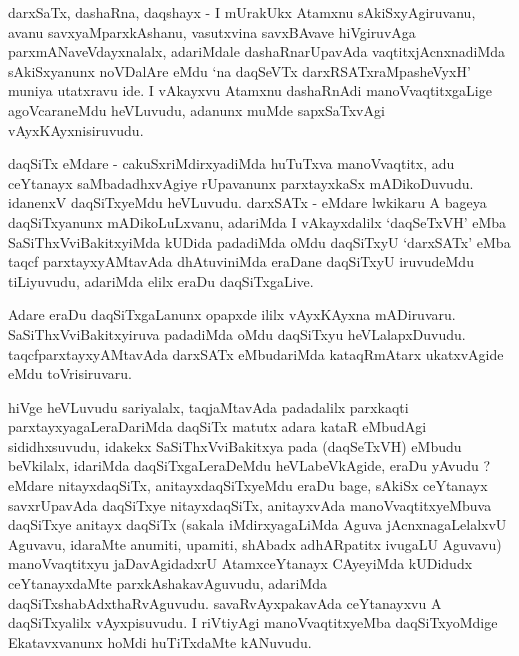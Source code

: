 \begin{artha}
darxSaTx, dashaRna, daqshayx - I mUrakUkx Atamxnu sAkiSxyAgiruvanu, avanu savxyaMparxkAshanu, vasutxvina savxBAvave hiVgiruvAga parxmANaveVdayxnalalx, adariMdale dashaRnarUpavAda vaqtitxjAcnxnadiMda sAkiSxyanunx noVDalAre eMdu `na daqSeVTx darxRSATxraMpasheVyxH' muniya utatxravu ide. I vAkayxvu Atamxnu dashaRnAdi manoVvaqtitxgaLige agoVcaraneMdu heVLuvudu, adanunx muMde sapxSaTxvAgi vAyxKAyxnisiruvudu.
\end{artha}


\begin{artha}
daqSiTx eMdare - cakuSxriMdirxyadiMda huTuTxva manoVvaqtitx, adu ceYtanayx saMbadadhxvAgiye rUpavanunx parxtayxkaSx mADikoDuvudu. idanenxV daqSiTxyeMdu heVLuvudu. darxSATx - eMdare lwkikaru A bageya daqSiTxyanunx mADikoLuLxvanu, adariMda I vAkayxdalilx `daqSeTxVH' eMba SaSiThxVviBakitxyiMda kUDida padadiMda oMdu daqSiTxyU `darxSATx' eMba taqcf parxtayxyAMtavAda dhAtuviniMda eraDane daqSiTxyU iruvudeMdu tiLiyuvudu, adariMda elilx eraDu daqSiTxgaLive.
\end{artha}


\begin{artha}
Adare eraDu daqSiTxgaLanunx opapxde ililx vAyxKAyxna mADiruvaru. SaSiThxVviBakitx\-yiruva padadiMda oMdu daqSiTxyu heVLalapxDuvudu. taqcfparxtayxyAMtavAda darxSATx eMbudariMda kataqRmAtarx ukatxvAgide eMdu toVrisiruvaru.
\end{artha}


\begin{artha}
hiVge heVLuvudu sariyalalx, taqjaMtavAda padadalilx parxkaqti parxtayxyagaLeraDariMda daqSiTx matutx adara kataR eMbudAgi sididhxsuvudu, idakekx SaSiThxVviBakitxya pada (daqSeTxVH) eMbudu beVkilalx, idariMda daqSiTxgaLeraDeMdu heVLabeVkAgide, eraDu yAvudu ? eMdare nitayxdaqSiTx, anitayxdaqSiTxyeMdu eraDu bage, sAkiSx ceYtanayx savxrUpavAda daqSiTxye nitayxdaqSiTx, anitayxvAda manoVvaqtitxyeMbuva daqSiTxye anitayx daqSiTx (sakala iMdirxyagaLiMda Aguva jAcnxnagaLelalxvU Aguvavu, idaraMte anumiti, upamiti, shAbadx adhARpatitx ivugaLU Aguvavu) manoVvaqtitxyu jaDavAgidadxrU AtamxceYtanayx CAyeyiMda kUDidudx ceYtanayxdaMte parxkAshakavAguvudu, adariMda daqSiTxshabAdxthaRvAguvudu. savaRvAyxpakavAda ceYtanayxvu A daqSiTxyalilx vAyxpisuvudu. I riVtiyAgi manoVvaqtitxyeMba daqSiTxyoMdige Ekatavxvanunx hoMdi huTiTxdaMte kANuvudu.
\end{artha}


